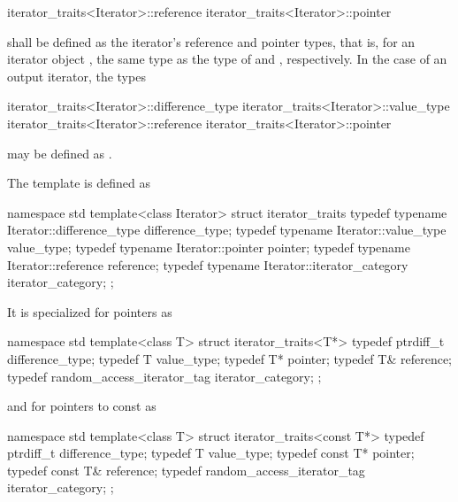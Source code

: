 \begin{removedblock}
\begin{codeblock}
iterator_traits<Iterator>::reference
iterator_traits<Iterator>::pointer
\end{codeblock}

shall be defined as the iterator's reference and pointer types, that is, for an
iterator object , the same type as the type of  and ,
respectively. In the case of an output iterator, the types

\begin{codeblock}
iterator_traits<Iterator>::difference_type
iterator_traits<Iterator>::value_type
iterator_traits<Iterator>::reference
iterator_traits<Iterator>::pointer
\end{codeblock}

may be defined as .

\pnum
The template
is defined as

\begin{codeblock}
namespace std {
  template<class Iterator> struct iterator_traits {
    typedef typename Iterator::difference_type difference_type;
    typedef typename Iterator::value_type value_type;
    typedef typename Iterator::pointer pointer;
    typedef typename Iterator::reference reference;
    typedef typename Iterator::iterator_category iterator_category;
  };
}
\end{codeblock}

\pnum
It is specialized for pointers as

\begin{codeblock}
namespace std {
  template<class T> struct iterator_traits<T*> {
    typedef ptrdiff_t difference_type;
    typedef T value_type;
    typedef T* pointer;
    typedef T& reference;
    typedef random_access_iterator_tag iterator_category;
  };
}
\end{codeblock}

and for pointers to const as

\begin{codeblock}
namespace std {
  template<class T> struct iterator_traits<const T*> {
    typedef ptrdiff_t difference_type;
    typedef T value_type;
    typedef const T* pointer;
    typedef const T& reference;
    typedef random_access_iterator_tag iterator_category;
  };
}
\end{codeblock}
\end{removedblock}

